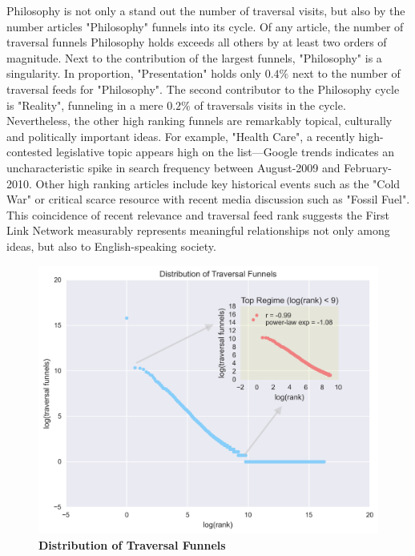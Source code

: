 \documentclass[pre,twocolumn,twoside,superscriptaddress,floatfix, aps, 10pt]{revtex4-1}
\begin{document}
Philosophy is not only a stand out the number of traversal visits, but also by the number articles "Philosophy" funnels into
its cycle. Of any article, the number of traversal funnels Philosophy holds exceeds 
all others by at least two orders of magnitude.
Next to the contribution of the largest funnels, "Philosophy" is a singularity. 
In proportion, "Presentation" holds only $0.4\%$ next to the number of traversal feeds for "Philosophy".
The second contributor to the Philosophy cycle is "Reality", funneling in a mere $0.2\%$ of traversals visits in the cycle.
Nevertheless, the other high ranking funnels are remarkably topical, culturally and politically important ideas.  For example, "Health Care", a recently high-contested legislative topic appears high on the list---Google trends indicates an uncharacteristic spike in search frequency between August-2009 and February-2010.
Other high ranking articles include key historical events such as the "Cold War" or critical scarce resource with recent 
media discussion such as "Fossil Fuel".
This coincidence of recent relevance and traversal feed rank suggests the First Link Network measurably represents
meaningful relationships not only among ideas, but also to English-speaking society. 
\begin{figure}[tp!]
  \centering	
  \includegraphics[width=\columnwidth]{graphics/funnels_distribution.png}
  \caption{
    \textbf{Distribution of Traversal Funnels}
  }
  \label{fig:Funnels Distribution}
\end{figure}
\end{document}
